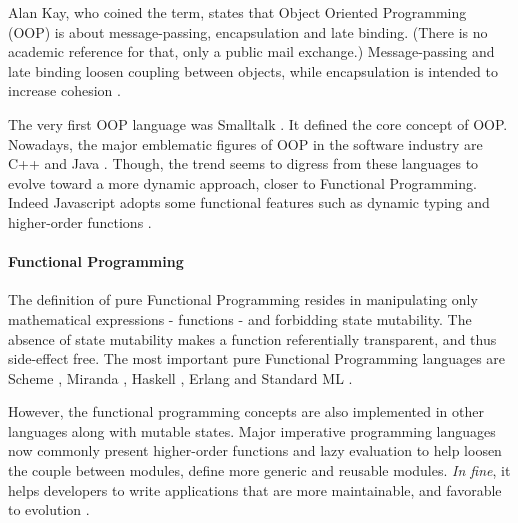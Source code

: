 
Alan Kay, who coined the term, states that Object Oriented Programming (OOP) is about message-passing, encapsulation and late binding.
(There is no academic reference for that, only a public mail exchange.)
Message-passing and late binding loosen coupling between objects, while encapsulation is intended to increase cohesion .

The very first OOP language was Smalltalk \cite{Goldberg1984}.
It defined the core concept of OOP.
Nowadays, the major emblematic figures of OOP in the software industry are C++ and Java \cite{Gosling2000,Stroustrup1986}.
Though, the trend seems to digress from these languages to evolve toward a more dynamic approach, closer to Functional Programming.
Indeed Javascript adopts some functional features such as dynamic typing and higher-order functions \cite{Ecma1999}.

\paragraph{Functional Programming} \label{chapter3:software-maintainability:programming-models:functional-programming}


The definition of pure Functional Programming resides in manipulating only mathematical expressions - functions - and forbidding state mutability.
The absence of state mutability makes a function referentially transparent, and thus side-effect free.
The most important pure Functional Programming languages are Scheme \cite{Rees1986}, Miranda \cite{Turner1986}, Haskell \cite{Hudak1992}, Erlang \cite{JoeArmstrong} and Standard ML \cite{Milner1997}.

However, the functional programming concepts are also implemented in other languages along with mutable states.
Major imperative programming languages now commonly present higher-order functions and lazy evaluation to help loosen the couple between modules, define more generic and reusable modules.
\textit{In fine}, it helps developers to write applications that are more maintainable, and favorable to evolution \cite{Hughes1989,Turner1981}.


